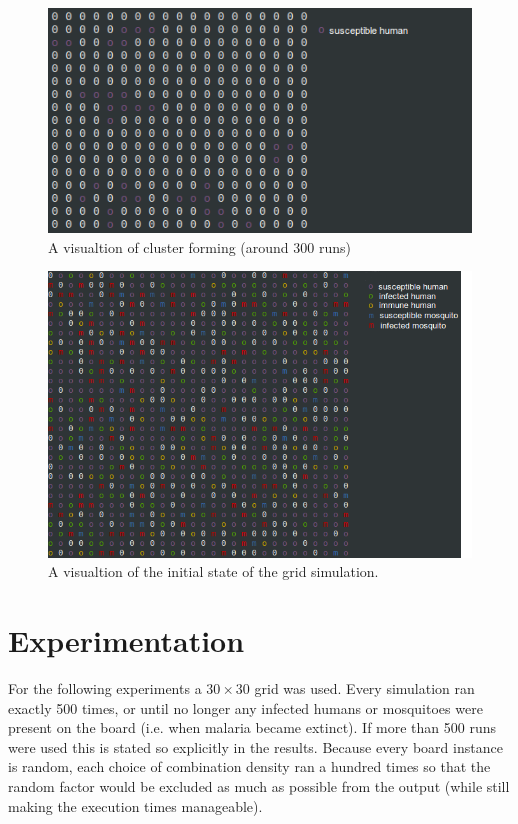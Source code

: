 \documentclass[a4paper]{report}
\begin{document}
\begin{figure}[htbp]
    \centering
    \includegraphics[width=1\textwidth]{population_clusters.png}
    \caption{A visualtion of cluster forming (around 300 runs)}
    \label{fig:clustering}
\end{figure}

\begin{figure}[htbp]
    \centering
    \includegraphics[width=1\textwidth]{malaria_ascii.png}
    \caption{A visualtion of the initial state of the grid simulation. }
    \label{fig:ascii}
\end{figure}

\section{Experimentation} 
For the following experiments a $30 \times 30$ grid was used. Every simulation ran exactly
500 times, or until no longer any infected humans or mosquitoes were present on
the board (i.e. when  malaria became extinct). If more than 500 runs
were used this is stated so explicitly in the results.
Because every board instance is random, each choice of combination density ran
a hundred times so that the random factor would be excluded as much as possible
from the output (while still making the execution times manageable).
\end{document}
